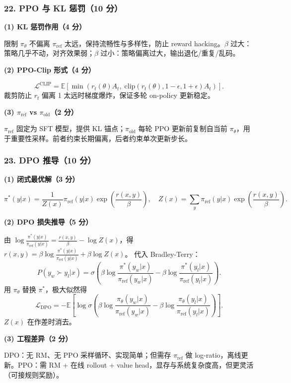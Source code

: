 \documentclass[11pt,a4paper]{article}
\begin{document}
\subsubsection*{22. PPO 与 KL 惩罚（10 分）}

\noindent\textbf{(1) KL 惩罚作用（4 分）}

限制 $\pi_\theta$ 不偏离 $\pi_{\mathrm{ref}}$ 太远，保持流畅性与多样性，防止 reward hacking。$\beta$ 过大：策略几乎不动，对齐效果弱；$\beta$ 过小：策略偏离过大，输出退化/重复/乱码。

\noindent\textbf{(2) PPO-Clip 形式（4 分）}

\[
\mathcal{L}^{\mathrm{CLIP}}=\mathbb{E}\!\left[\min\!\left(r_t(\theta)A_t,\;\mathrm{clip}(r_t(\theta),1-\epsilon,1+\epsilon)A_t\right)\right].
\]
裁剪防止 $r_t$ 偏离 1 太远时梯度爆炸，保证多轮 on-policy 更新稳定。

\noindent\textbf{(3) $\pi_{\mathrm{ref}}$ vs $\pi_{\mathrm{old}}$（2 分）}

$\pi_{\mathrm{ref}}$ 固定为 SFT 模型，提供 KL 锚点；$\pi_{\mathrm{old}}$ 每轮 PPO 更新前复制自当前 $\pi_\theta$，用于重要性采样。前者约束长期偏离，后者约束单次更新步长。

\subsubsection*{23. DPO 推导（10 分）}

\noindent\textbf{(1) 闭式最优解（3 分）}

\[
\pi^*(y|x)=\frac{1}{Z(x)}\pi_{\mathrm{ref}}(y|x)\exp\!\left(\frac{r(x,y)}{\beta}\right),\quad Z(x)=\sum_y\pi_{\mathrm{ref}}(y|x)\exp\!\left(\frac{r(x,y)}{\beta}\right).
\]

\noindent\textbf{(2) DPO 损失推导（5 分）}

由 $\log\frac{\pi^*(y|x)}{\pi_{\mathrm{ref}}(y|x)}=\frac{r(x,y)}{\beta}-\log Z(x)$，得
$r(x,y)=\beta\log\frac{\pi^*(y|x)}{\pi_{\mathrm{ref}}(y|x)}+\beta\log Z(x)$。
代入 Bradley-Terry：
\[
P(y_w\succ y_l|x)=\sigma\!\left(\beta\log\frac{\pi^*(y_w|x)}{\pi_{\mathrm{ref}}(y_w|x)}-\beta\log\frac{\pi^*(y_l|x)}{\pi_{\mathrm{ref}}(y_l|x)}\right).
\]
用 $\pi_\theta$ 替换 $\pi^*$，极大似然得
\[
\mathcal{L}_{\mathrm{DPO}}=-\mathbb{E}\!\left[\log\sigma\!\left(\beta\log\frac{\pi_\theta(y_w|x)}{\pi_{\mathrm{ref}}(y_w|x)}-\beta\log\frac{\pi_\theta(y_l|x)}{\pi_{\mathrm{ref}}(y_l|x)}\right)\right].
\]
$Z(x)$ 在作差时消去。

\noindent\textbf{(3) 工程差异（2 分）}

DPO：无 RM、无 PPO 采样循环、实现简单；但需存 $\pi_{\mathrm{ref}}$ 做 log-ratio，离线更新。PPO：需 RM + 在线 rollout + value head，显存与系统复杂度高，但更灵活（可接规则奖励）。
\end{document}
